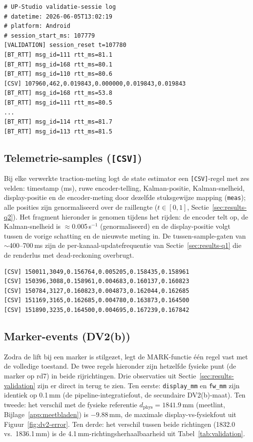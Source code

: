 \documentclass[10pt, a4paper, twocolumn]{article}
\begin{document}
\begin{lstlisting}
# UP-Studio validatie-sessie log
# datetime: 2026-06-05T13:02:19
# platform: Android
# session_start_ms: 107779
[VALIDATION] session_reset t=107780
[BT_RTT] msg_id=111 rtt_ms=81.1
[BT_RTT] msg_id=168 rtt_ms=80.1
[BT_RTT] msg_id=110 rtt_ms=80.6
[CSV] 107960,462,0.019843,0.000000,0.019843,0.019843
[BT_RTT] msg_id=168 rtt_ms=53.8
[BT_RTT] msg_id=111 rtt_ms=80.5
...
[BT_RTT] msg_id=114 rtt_ms=81.7
[BT_RTT] msg_id=113 rtt_ms=81.5
\end{lstlisting}

\subsection{Telemetrie-samples (\texttt{[CSV]})}
Bij elke verwerkte traction-meting logt de state estimator een
\texttt{[CSV]}-regel met zes velden: timestamp (ms), ruwe encoder-telling,
Kalman-positie, Kalman-snelheid, display-positie en de encoder-meting door
dezelfde stuksgewijze mapping (\texttt{meas}); alle posities zijn
genormaliseerd over de raillengte ($t \in [0,1]$,
Sectie~\ref{sec:results-q2}). Het fragment hieronder is genomen tijdens het
rijden: de encoder telt op, de Kalman-snelheid is $\approx$0.005\,s$^{-1}$
(genormaliseerd) en de display-positie volgt tussen de vorige schatting en de
nieuwste meting in. De tussen-sample-gaten van $\sim$400--700\,ms zijn de
per-kanaal-updatefrequentie van Sectie~\ref{sec:results-q1} die de renderlus met
dead-reckoning overbrugt.

\begin{lstlisting}
[CSV] 150011,3049,0.156764,0.005205,0.158435,0.158961
[CSV] 150396,3088,0.158961,0.004683,0.160137,0.160823
[CSV] 150784,3127,0.160823,0.004873,0.162044,0.162685
[CSV] 151169,3165,0.162685,0.004780,0.163873,0.164500
[CSV] 151890,3235,0.164500,0.004695,0.167239,0.167842
\end{lstlisting}

\subsection{Marker-events (DV2(b))}
Zodra de lift bij een marker is stilgezet, legt de MARK-functie één regel vast
met de volledige toestand. De twee regels hieronder zijn hetzelfde fysieke punt (de
marker op rd7) in beide rijrichtingen. Drie observaties uit
Sectie~\ref{sec:results-validation} zijn er direct in terug te zien. Ten eerste:
\texttt{display\_mm} en \texttt{fw\_mm} zijn identiek op 0.1\,mm (de
pipeline-integratiefout, de secundaire DV2(b)-maat). Ten tweede: het verschil met
de fysieke referentie $d_{\text{phys}} = 1841.9$\,mm (meetlint,
Bijlage~\ref{app:meetbladen}) is $-9.88$\,mm, de maximale display-vs-fysiekfout uit
Figuur~\ref{fig:dv2-error}. Ten derde: het verschil tussen beide richtingen
(1832.0 vs.\ 1836.1\,mm) is de 4.1\,mm-richtingsherhaalbaarheid uit
Tabel~\ref{tab:validation}.
\end{document}
